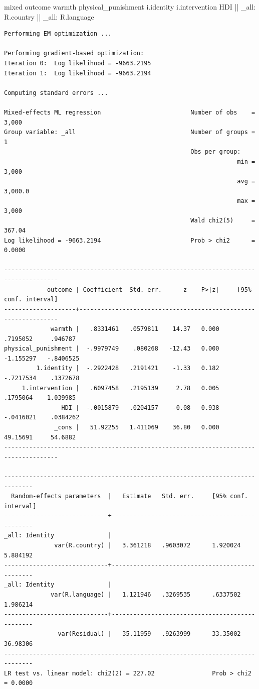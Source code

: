 \documentclass[
  letterpaper,
  DIV=11,
  numbers=noendperiod]{scrreprt}
\newenvironment{Shaded}{\begin{snugshade}}{\end{snugshade}}
\newcommand{\DataTypeTok}[1]{\textcolor[rgb]{0.68,0.00,0.00}{#1}}
\newcommand{\KeywordTok}[1]{\textcolor[rgb]{0.00,0.23,0.31}{#1}}
\newcommand{\NormalTok}[1]{\textcolor[rgb]{0.00,0.23,0.31}{#1}}
\begin{document}
\begin{Shaded}
\begin{Highlighting}[]

\NormalTok{mixed outcome warmth physical\_punishment i.}\KeywordTok{identity}\NormalTok{ i.intervention HDI || }\DataTypeTok{\_all}\NormalTok{: R.country || }\DataTypeTok{\_all}\NormalTok{: R.language}
\end{Highlighting}
\end{Shaded}

\begin{verbatim}
Performing EM optimization ...

Performing gradient-based optimization: 
Iteration 0:  Log likelihood = -9663.2195  
Iteration 1:  Log likelihood = -9663.2194  

Computing standard errors ...

Mixed-effects ML regression                         Number of obs    =   3,000
Group variable: _all                                Number of groups =       1
                                                    Obs per group:
                                                                 min =   3,000
                                                                 avg = 3,000.0
                                                                 max =   3,000
                                                    Wald chi2(5)     =  367.04
Log likelihood = -9663.2194                         Prob > chi2      =  0.0000

-------------------------------------------------------------------------------------
            outcome | Coefficient  Std. err.      z    P>|z|     [95% conf. interval]
--------------------+----------------------------------------------------------------
             warmth |   .8331461   .0579811    14.37   0.000     .7195052     .946787
physical_punishment |  -.9979749    .080268   -12.43   0.000    -1.155297   -.8406525
         1.identity |  -.2922428   .2191421    -1.33   0.182    -.7217534    .1372678
     1.intervention |   .6097458   .2195139     2.78   0.005     .1795064    1.039985
                HDI |  -.0015879   .0204157    -0.08   0.938    -.0416021    .0384262
              _cons |   51.92255   1.411069    36.80   0.000     49.15691     54.6882
-------------------------------------------------------------------------------------

------------------------------------------------------------------------------
  Random-effects parameters  |   Estimate   Std. err.     [95% conf. interval]
-----------------------------+------------------------------------------------
_all: Identity               |
              var(R.country) |   3.361218   .9603072      1.920024    5.884192
-----------------------------+------------------------------------------------
_all: Identity               |
             var(R.language) |   1.121946   .3269535      .6337502    1.986214
-----------------------------+------------------------------------------------
               var(Residual) |   35.11959   .9263999      33.35002    36.98306
------------------------------------------------------------------------------
LR test vs. linear model: chi2(2) = 227.02                Prob > chi2 = 0.0000


\end{verbatim}
\end{document}
